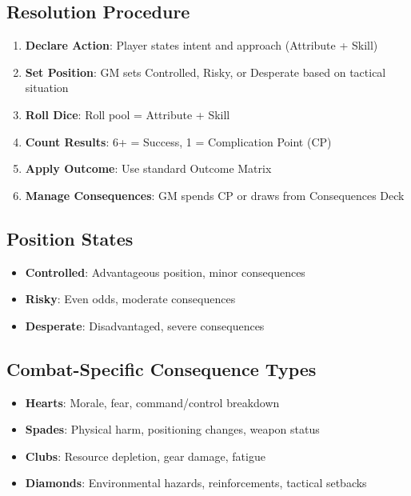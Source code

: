 \documentclass[11pt]{article}
\begin{document}
\subsection{Resolution Procedure}
\begin{enumerate}
    \item \textbf{Declare Action}: Player states intent and approach (Attribute + Skill)
    \item \textbf{Set Position}: GM sets Controlled, Risky, or Desperate based on tactical situation
    \item \textbf{Roll Dice}: Roll pool = Attribute + Skill
    \item \textbf{Count Results}: 6+ = Success, 1 = Complication Point (CP)
    \item \textbf{Apply Outcome}: Use standard Outcome Matrix
    \item \textbf{Manage Consequences}: GM spends CP or draws from Consequences Deck
\end{enumerate}

\subsection{Position States}
\begin{itemize}
    \item \textbf{Controlled}: Advantageous position, minor consequences
    \item \textbf{Risky}: Even odds, moderate consequences  
    \item \textbf{Desperate}: Disadvantaged, severe consequences
\end{itemize}

\subsection{Combat-Specific Consequence Types}
\begin{itemize}
    \item \textbf{Hearts}: Morale, fear, command/control breakdown
    \item \textbf{Spades}: Physical harm, positioning changes, weapon status
    \item \textbf{Clubs}: Resource depletion, gear damage, fatigue
    \item \textbf{Diamonds}: Environmental hazards, reinforcements, tactical setbacks
\end{itemize}
\end{document}
